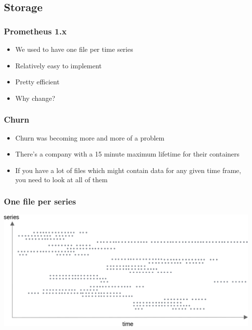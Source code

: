 \documentclass[t]{beamer}
\begin{document}
\subsection{Storage}

\begin{frame}
	\frametitle{Prometheus 1.x}
	\begin{itemize}
		\item We used to have one file per time series
		\item Relatively easy to implement
		\item Pretty efficient
		\item Why change?
	\end{itemize}
\end{frame}

\begin{frame}
	\frametitle{Churn}
	\begin{itemize}
		\item Churn was becoming more and more of a problem
		\item There's a company with a 15 minute maximum lifetime for their containers
		\item If you have a lot of files which might contain data for any given time frame, you need to look at all of them
	\end{itemize}
\end{frame}


\begin{frame}
	\frametitle{One file per series}
	\includegraphics[width=\textwidth]{storage--file_per_series.png}
\end{frame}
\end{document}
